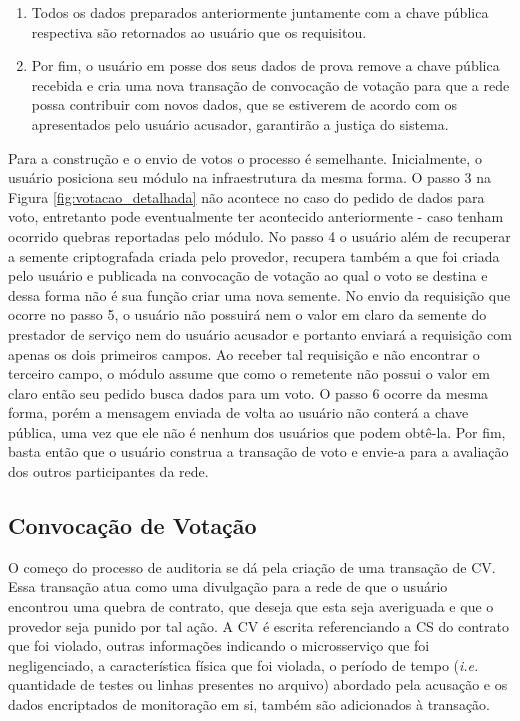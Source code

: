 \begin{enumerate}[label=\textbf{\arabic*})]
    \item Todos os dados preparados anteriormente juntamente com a chave pública respectiva são retornados ao usuário que os requisitou.
    \item Por fim, o usuário em posse dos seus dados de prova remove a chave pública recebida e cria uma nova transação de convocação de votação para que a rede possa contribuir com novos dados, que se estiverem de acordo com os apresentados pelo usuário acusador, garantirão a justiça do sistema.  
\end{enumerate}

Para a construção e o envio de votos o processo é semelhante. Inicialmente, o usuário posiciona seu módulo na infraestrutura da mesma forma. O passo 3 na Figura \ref{fig:votacao_detalhada} não acontece no caso do pedido de dados para voto, entretanto pode eventualmente ter acontecido anteriormente - caso tenham ocorrido quebras reportadas pelo módulo. No passo 4 o usuário além de recuperar a semente criptografada criada pelo provedor, recupera também a que foi criada pelo usuário e publicada na convocação de votação ao qual o voto se destina e dessa forma não é sua função criar uma nova semente. No envio da requisição que ocorre no passo 5, o usuário não possuirá nem o valor em claro da semente do prestador de serviço nem do usuário acusador e portanto enviará a requisição com apenas os dois primeiros campos. Ao receber tal requisição e não encontrar o terceiro campo, o módulo assume que como o remetente não possui o valor em claro então seu pedido busca dados para um voto. O passo 6 ocorre da mesma forma, porém a mensagem enviada de volta ao usuário não conterá a chave pública, uma vez que ele não é nenhum dos usuários que podem obtê-la. Por fim, basta então que o usuário construa a transação de voto e envie-a para a avaliação dos outros participantes da rede.


%
\subsection{Convocação de Votação}
\label{sec:proposta:auditoria:cv}

O começo do processo de auditoria se dá pela criação de uma transação de \ac{CV}. Essa transação atua como uma divulgação para a rede de que o usuário encontrou uma quebra de contrato, que deseja que esta seja averiguada e que o provedor seja punido por tal ação. A \ac{CV} é escrita referenciando a \ac{CS} do contrato que foi violado, outras informações indicando o microsserviço que foi negligenciado, a característica física que foi violada, o período de tempo (\textit{i.e.} quantidade de testes ou linhas presentes no arquivo) abordado pela acusação e os dados encriptados de monitoração em si, também são adicionados à transação. 

